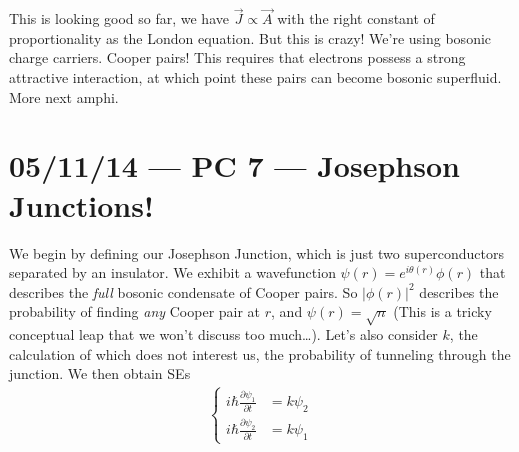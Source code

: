 \documentclass[10pt]{report}
\newcommand{\pd}[2]{\frac{\partial #1}{\partial#2}}
\newcommand{\abs}[1]{\left|#1\right|}
\begin{document}
This is looking good so far, we have $\vec{J} \propto \vec{A}$ with the right constant of proportionality as the London equation. But this is crazy! We're using bosonic charge carriers. Cooper pairs! This requires that electrons possess a strong attractive interaction, at which point these pairs can become bosonic superfluid. More next amphi. 
\chapter{05/11/14 --- PC 7 --- Josephson Junctions!}

We begin by defining our Josephson Junction, which is just two superconductors separated by an insulator. We exhibit a wavefunction $\psi(r) = e^{i\theta(r)}\phi(r)$ that describes the \emph{full} bosonic condensate of Cooper pairs. So $\abs{\phi(r)}^2$ describes the probability of finding \emph{any} Cooper pair at $r$, and $\psi(r) = \sqrt{n}$ (This is a tricky conceptual leap that we won't discuss too much\dots). Let's also consider $k$, the calculation of which does not interest us, the probability of tunneling through the junction. We then obtain SEs
\begin{align}
    \begin{cases}
        i\hbar \pd{\psi_1}{t}\!\!\!\!\! &= k\psi_2\\[5pt]
        i\hbar \pd{\psi_2}{t}\!\!\!\!\! &= k\psi_1
    \end{cases}
\end{align}
\end{document}
